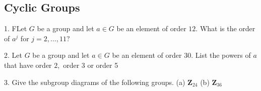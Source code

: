 \subsection{Cyclic Groups}
\begin{mdframed}[style=darkQuesion]
  1. FLet $G$ be a group and let $a \in G$ be an element of order $12 .$ What is the order of $a^{j}$ for $j=2, \ldots, 11 ?$
\end{mdframed}
\begin{mdframed}[style=darkAnswer,frametitle={Joe Starr}]
  
\end{mdframed}
\newpage
\begin{mdframed}[style=darkQuesion]
2. Let $G$ be a group and let $a \in G$ be an element of order $30 .$ List the powers of $a$ that have order $2,$ order 3 or order 5
\end{mdframed}
\begin{mdframed}[style=darkAnswer,frametitle={Joe Starr}]
  
\end{mdframed}
\newpage
\begin{mdframed}[style=darkQuesion]
3. Give the subgroup diagrams of the following groups.
(a) $\mathbf{Z}_{24}$
(b) $\mathbf{Z}_{36}$
\end{mdframed}
\begin{mdframed}[style=darkAnswer,frametitle={Joe Starr}]
  
\end{mdframed}
